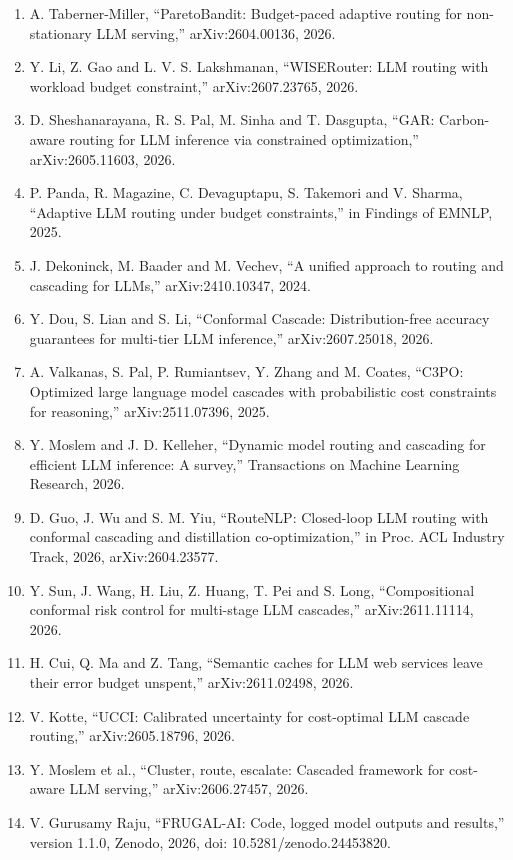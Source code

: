 \documentclass[
  10pt,
]{article}
\begin{document}
\begin{enumerate}
  to 2024, Hugging Face,
  https://huggingface.co/datasets/AI-MO/aimo-validation-aime.
\item
  A. Taberner-Miller, ``ParetoBandit: Budget-paced adaptive routing for
  non-stationary LLM serving,'' arXiv:2604.00136, 2026.
\item
  Y. Li, Z. Gao and L. V. S. Lakshmanan, ``WISERouter: LLM routing with
  workload budget constraint,'' arXiv:2607.23765, 2026.
\item
  D. Sheshanarayana, R. S. Pal, M. Sinha and T. Dasgupta, ``GAR:
  Carbon-aware routing for LLM inference via constrained optimization,''
  arXiv:2605.11603, 2026.
\item
  P. Panda, R. Magazine, C. Devaguptapu, S. Takemori and V. Sharma,
  ``Adaptive LLM routing under budget constraints,'' in Findings of
  EMNLP, 2025.
\item
  J. Dekoninck, M. Baader and M. Vechev, ``A unified approach to routing
  and cascading for LLMs,'' arXiv:2410.10347, 2024.
\item
  Y. Dou, S. Lian and S. Li, ``Conformal Cascade: Distribution-free
  accuracy guarantees for multi-tier LLM inference,'' arXiv:2607.25018,
  2026.
\item
  A. Valkanas, S. Pal, P. Rumiantsev, Y. Zhang and M. Coates, ``C3PO:
  Optimized large language model cascades with probabilistic cost
  constraints for reasoning,'' arXiv:2511.07396, 2025.
\item
  Y. Moslem and J. D. Kelleher, ``Dynamic model routing and cascading
  for efficient LLM inference: A survey,'' Transactions on Machine
  Learning Research, 2026.
\item
  D. Guo, J. Wu and S. M. Yiu, ``RouteNLP: Closed-loop LLM routing with
  conformal cascading and distillation co-optimization,'' in Proc. ACL
  Industry Track, 2026, arXiv:2604.23577.
\item
  Y. Sun, J. Wang, H. Liu, Z. Huang, T. Pei and S. Long, ``Compositional
  conformal risk control for multi-stage LLM cascades,''
  arXiv:2611.11114, 2026.
\item
  H. Cui, Q. Ma and Z. Tang, ``Semantic caches for LLM web services
  leave their error budget unspent,'' arXiv:2611.02498, 2026.
\item
  V. Kotte, ``UCCI: Calibrated uncertainty for cost-optimal LLM cascade
  routing,'' arXiv:2605.18796, 2026.
\item
  Y. Moslem et al., ``Cluster, route, escalate: Cascaded framework for
  cost-aware LLM serving,'' arXiv:2606.27457, 2026.
\item
  V. Gurusamy Raju, ``FRUGAL-AI: Code, logged model outputs and
  results,'' version 1.1.0, Zenodo, 2026, doi: 10.5281/zenodo.24453820.
\end{enumerate}
\end{document}
